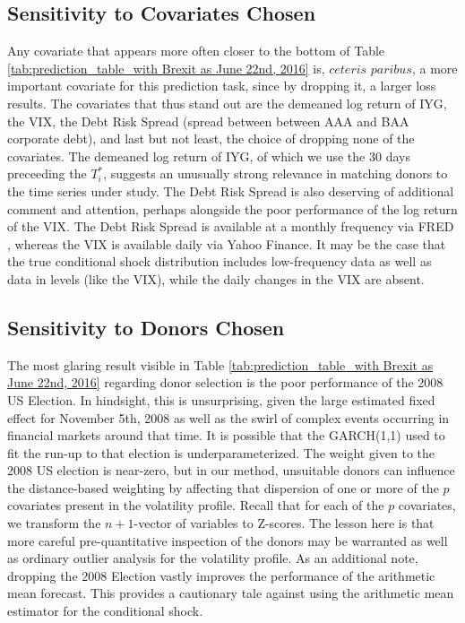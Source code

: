 \documentclass[11pt,3p,review,authoryear]{elsarticle}
\theoremstyle{definition}
\begin{document}
\subsection{Sensitivity to Covariates Chosen}
Any covariate that appears more often closer to the bottom of Table \ref{tab:prediction_table_with Brexit as June 22nd, 2016} is, $\textit{ceteris paribus}$, a more important covariate for this prediction task, since by dropping it, a larger loss results.  The covariates that thus stand out are the demeaned log return of IYG, the VIX, the Debt Risk Spread (spread between between AAA and BAA corporate debt), and last but not least, the choice of dropping none of the covariates.  The demeaned log return of IYG, of which we use the 30 days preceeding the $T_{i}^{*}$, suggests an unusually strong relevance in matching donors to the time series under study.  The Debt Risk Spread is also deserving of additional comment and attention, perhaps alongside the poor performance of the log return of the VIX.  The Debt Risk Spread is available at a monthly frequency via FRED \citep{boysel2021package}, whereas the VIX is available daily via Yahoo Finance.  It may be the case that the true conditional shock distribution includes low-frequency data as well as data in levels (like the VIX), while the daily changes in the VIX are absent.


\subsection{Sensitivity to Donors Chosen}

The most glaring result visible in Table \ref{tab:prediction_table_with Brexit as June 22nd, 2016} regarding donor selection is the poor performance of the 2008 US Election.  In hindsight, this is unsurprising, given the large estimated fixed effect for November 5th, 2008 as well as the swirl of complex events occurring in financial markets around that time.  It is possible that the GARCH(1,1) used to fit the run-up to that election is underparameterized.  The weight given to the 2008 US election is near-zero, but in our method, unsuitable donors can influence the distance-based weighting by affecting that dispersion of one or more of the $p$ covariates present in the volatility profile.  Recall that for each of the $p$ covariates, we transform the $n+1$-vector of variables to Z-scores.  The lesson here is that more careful pre-quantitative inspection of the donors may be warranted as well as ordinary outlier analysis for the volatility profile.  As an additional note, dropping the 2008 Election vastly improves the performance of the arithmetic mean forecast.  This provides a cautionary tale against using the arithmetic mean estimator for the conditional shock.  
\end{document}
